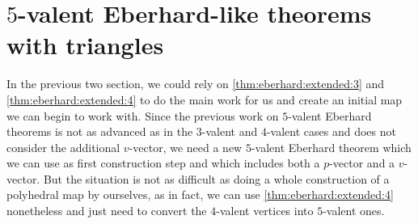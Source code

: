 \section{$5$-valent {\sc Eberhard}-like theorems with triangles}\label{sec:3:5}

In the previous two section, we could rely on \autoref{thm:eberhard:extended:3} and \autoref{thm:eberhard:extended:4} to do the main work for us and create an initial map we can begin to work with. Since the previous work on $5$-valent {\sc Eberhard} theorems is not as advanced as in the $3$-valent and $4$-valent cases and does not consider the additional $v$-vector, we need a new $5$-valent {\sc Eberhard} theorem which we can use as first construction step and which includes both a $p$-vector and a $v$-vector. But the situation is not as difficult as doing a whole construction of a polyhedral map by ourselves, as in fact, we can use \autoref{thm:eberhard:extended:4} nonetheless and just need to convert the $4$-valent vertices into $5$-valent ones.

